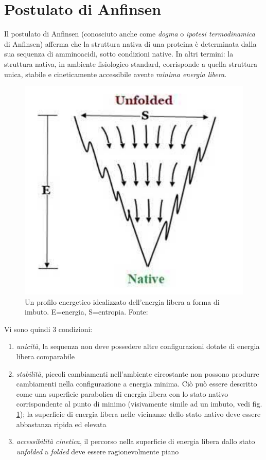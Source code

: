 \section{Postulato di Anfinsen}
{
Il postulato di Anfinsen (conosciuto anche come \textit{dogma} o \textit{ipotesi termodinamica} di Anfinsen) afferma che la struttura nativa di una proteina è determinata dalla sua sequenza di amminoacidi, sotto condizioni native. In altri termini: la struttura nativa, in ambiente fisiologico standard, corrisponde a quella struttura unica, stabile e cineticamente accessibile avente \textit{minima energia libera}. 

\begin{figure}[h]
	\centering
	\includegraphics[scale=0.3]{images/funnel-folding.png}
	\caption{Un profilo energetico idealizzato dell'energia libera a forma di imbuto. E=energia, S=entropia. Fonte: \cite{pal2019fundamentals}}
	\label{fig:funnel}
\end{figure}

Vi sono quindi 3 condizioni:

\begin{enumerate}
	\item \textit{unicità}, la sequenza non deve possedere altre configurazioni dotate di energia libera comparabile
	\item \textit{stabilità}, piccoli cambiamenti nell'ambiente circostante non possono produrre cambiamenti nella configurazione a energia minima. Ciò può essere descritto come una superficie parabolica di energia libera con lo stato nativo corrispondente al punto di minimo (visivamente simile ad un imbuto, vedi fig. \ref{fig:funnel}); la superficie di energia libera nelle vicinanze dello stato nativo deve essere abbastanza ripida ed elevata
	\item \textit{accessibilità cinetica}, il percorso nella superficie di energia libera dallo stato \textit{unfolded} a \textit{folded} deve essere ragionevolmente piano
\end{enumerate}


}
